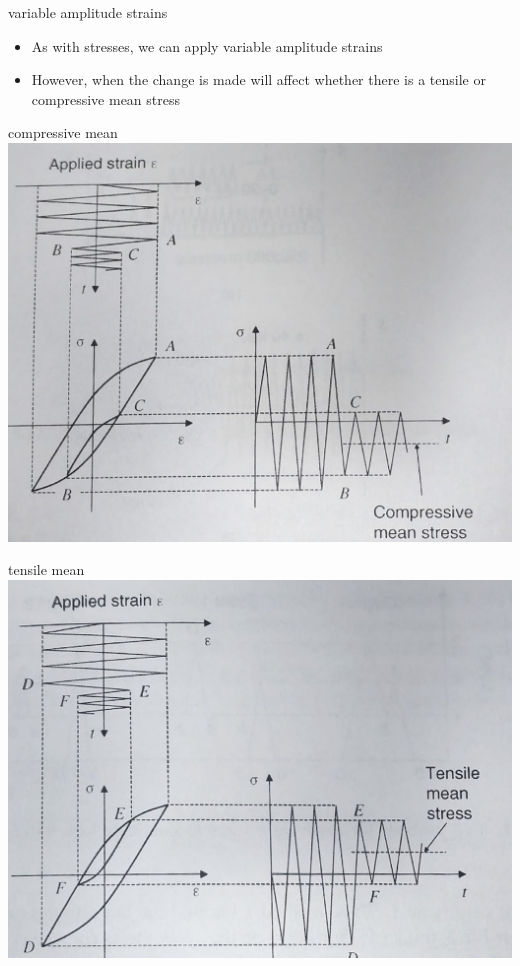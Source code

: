 \documentclass[
  letterpaper,
  ignorenonframetext,
  aspectratio=43,
  handout,
  12pt]{beamer}
\providecommand{\tightlist}{%
  \setlength{\itemsep}{0pt}\setlength{\parskip}{0pt}}
\providecommand{\tightlist}{%
\setlength{\itemsep}{0pt}\setlength{\parskip}{0pt}}
\let\Oldincludegraphics\includegraphics
\renewcommand{\includegraphics}[2][]{\Oldincludegraphics[width=\textwidth,height=0.7\textheight,keepaspectratio]{#2}}
\begin{document}
\begin{frame}{variable amplitude strains}
\protect\hypertarget{variable-amplitude-strains-1}{}
\begin{itemize}
\tightlist
\item
  As with stresses, we can apply variable amplitude strains
\item
  However, when the change is made will affect whether there is a
  tensile or compressive mean stress
\end{itemize}
\end{frame}

\begin{frame}{compressive mean}
\protect\hypertarget{compressive-mean}{}
\includegraphics{../images/compressive_mean.jpg}
\end{frame}

\begin{frame}{tensile mean}
\protect\hypertarget{tensile-mean}{}
\includegraphics{../images/tensile_mean.jpg}
\end{frame}
\end{document}
